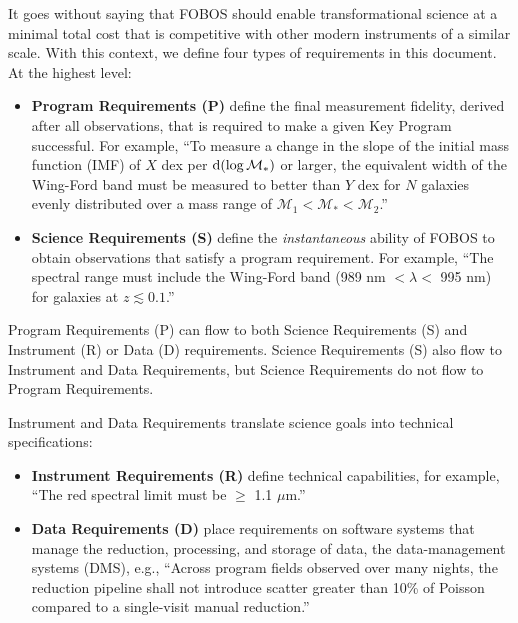 \documentclass[11pt,a4paper,twoside,onecolumn,openany,final,oldfontcommands]{memoir}
\begin{document}
\noindent It goes without saying that FOBOS should enable transformational science at a minimal total cost that is competitive with other modern instruments of a similar scale. With this context, we define four types of requirements in this document.  At the highest level:

\begin{itemize}
\item \textbf{Program Requirements (P)} define the final measurement fidelity, derived after all observations, that is required to make a given Key Program successful. For example, ``To measure a change in the slope of the initial mass function (IMF) of $X$ dex per ${\rm d}(\log\mathcal{M}_\ast)$ or larger, the equivalent width of the Wing-Ford band must be measured to better than $Y$ dex for $N$ galaxies evenly distributed over a mass range of $\mathcal{M}_1 < \mathcal{M}_\ast < \mathcal{M}_2$.''  

\item \textbf{Science Requirements (S)} define the \emph{instantaneous} ability of FOBOS to obtain observations that satisfy a program requirement.  For example, ``The spectral range must include the Wing-Ford band (989 nm $< \lambda <$ 995 nm) for galaxies at $z \lesssim 0.1$.''  
\end{itemize}

\noindent Program Requirements (P) can flow to both Science Requirements (S) and Instrument (R) or Data (D) requirements.  Science Requirements (S) also flow to Instrument and Data Requirements, but Science Requirements do not flow to Program Requirements.  

\noindent Instrument and Data Requirements translate science goals into technical specifications:


\begin{itemize}
\item \textbf{Instrument Requirements (R)} define technical capabilities, for example, ``The red spectral limit must be $\geq$ 1.1 $\mu$m.'' 

\item \textbf{Data Requirements (D)} place requirements on software systems that manage the reduction, processing, and storage of data, the data-management systems (DMS), e.g., ``Across program fields observed over many nights, the reduction pipeline shall not introduce scatter greater than 10\% of Poisson compared to a single-visit manual reduction.'' 
\end{itemize}
\end{document}
